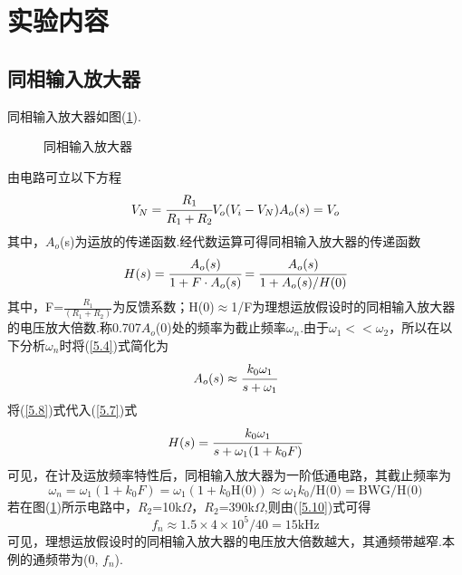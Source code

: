 \documentclass[a4paper]{article}
\begin{document}
\section{实验内容}
\subsection{同相输入放大器}
同相输入放大器如图(\ref{cdtxfdq}).
\begin{figure}[!h]
\centering
{}
\caption{同相输入放大器}\label{cdtxfdq}
\end{figure}
由电路可立以下方程
\begin{equation}
V_N = \cfrac{R_1}{R_1+R_2}V_o\\
(V_i - V_N)A_o(s) = V_o\label{5.6}
\end{equation}
其中，$A_o$(s)为运放的传递函数.经代数运算可得同相输入放大器的传递函数
\begin{equation}
H(s) = \cfrac{A_o(s)}{1+F\cdot A_o(s)} = \cfrac{A_o(s)}{1+A_o(s)/H(0)}\label{5.7}
\end{equation}
其中，F=$\frac{R_1}{(R_1+R_2)}$为反馈系数；H(0)$\approx$1/F为理想运放假设时的同相输入放大器的电压放大倍数.称0.707$A_o$(0)处的频率为截止频率$\omega_n$.由于$\omega_1 << \omega_2$，所以在以下分析$\omega_n$时将(\ref{5.4})式简化为
\begin{equation}
A_o(s) \approx \cfrac{k_0\omega_1}{s+\omega_1}\label{5.8}
\end{equation}
将(\ref{5.8})式代入(\ref{5.7})式
\begin{equation}
H(s) = \cfrac{k_0\omega_1}{s+\omega_1(1+k_0F)}\label{5.9}
\end{equation}
可见，在计及运放频率特性后，同相输入放大器为一阶低通电路，其截止频率为
\begin{equation}
\omega_n = \omega_1(1+k_0F) = \omega_1(1+k_0\text{H(0)}) \approx \omega_1k_0\text{/H(0)} = \text{BWG/H(0)}\label{5.10}
\end{equation}
若在图(\ref{cdtxfdq})所示电路中，$R_2$=10k$\Omega$，$R_2$=390k$\Omega$,则由(\ref{5.10})式可得
\begin{equation}
f_n \approx 1.5\times 4\times 10^5/40 = 15\text{kHz}\label{5.11}
\end{equation}
可见，理想运放假设时的同相输入放大器的电压放大倍数越大，其通频带越窄.本例的通频带为(0, $f_n$).%
\end{document}
